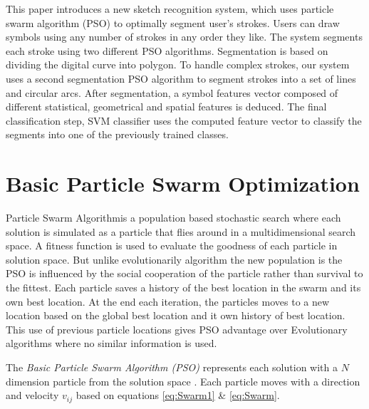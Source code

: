 \documentclass[10pt]{article}
\begin{document}
This paper introduces a new sketch recognition system, which uses particle swarm algorithm (PSO) to optimally segment user's strokes. Users can draw symbols using any number of strokes in any order they like. The system segments each stroke using two different PSO algorithms. Segmentation is based on dividing the digital curve into polygon\cite{PolygonApproximationPSO}. To handle complex strokes, our system uses a second segmentation PSO algorithm to segment strokes into a set of lines and circular arcs. After segmentation, a symbol features vector composed of different statistical, geometrical and spatial features is deduced. The final classification step, SVM classifier uses the computed feature vector to classify the segments into one of the previously trained classes. 

 

\section{Basic Particle Swarm Optimization}
\label{sec:ParticleSwarmAlgorithm}

 Particle Swarm Algorithm\cite{PSOFirst}is a population based stochastic search where each solution is simulated as a  particle that flies around in a multidimensional search space. A fitness function is used to evaluate the goodness of each particle in solution space. But unlike evolutionarily algorithm the new population is the PSO is influenced by the social cooperation of the particle rather than survival to the fittest. Each particle saves a history of the best location in the swarm and its own best location.  At the end each iteration, the particles moves to a new location based on the global best location and it own history of best location. This use of previous particle locations gives PSO advantage over Evolutionary algorithms where no similar information is used.


 The \textit{Basic Particle Swarm Algorithm (PSO)} represents each solution with a $N$ dimension particle from the solution space \cite{PSOFirst}. Each particle moves with a direction and velocity $v_{ij}$ based on equations \ref{eq:Swarm1} \& \ref{eq:Swarm}.
\end{document}
